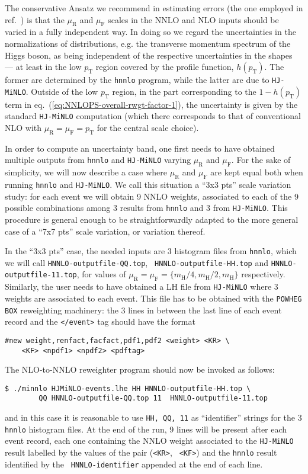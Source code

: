 \documentclass[11pt,a4paper]{article}
\newcommand{\noun}[1]{{\tt #1}}
\newcommand{\POWHEGBOX}{\noun{POWHEG BOX}}
\newcommand{\HJMINLO}{\noun{HJ-MiNLO}}
\newcommand{\HNNLO}{\noun{hnnlo}}
\newcommand{\mur}{\mu_{\scriptscriptstyle \mathrm{R}}}
\newcommand{\muf}{\mu_{\scriptscriptstyle \mathrm{F}}}
\newcommand{\pt}{p_{\scriptscriptstyle \mathrm{T}}}
\newcommand{\mh}{m_{\scriptscriptstyle \mathrm{H}}}
\begin{document}
The conservative Ansatz we recommend in estimating errors (the one
employed in ref.~\cite{Hamilton:2013fea}) is that the $\mur$ and
$\muf$ scales in the NNLO and NLO inputs should be varied in a fully
independent way. In doing so we regard the uncertainties in the
normalizations of distributions, e.g. the transverse momentum spectrum
of the Higgs boson, as being independent of the respective
uncertainties in the shapes --- at least in the low $\pt$ region
covered by the profile function, $h(\pt)$.  The former are determined
by the \HNNLO{} program, while the latter are due to
\HJMINLO{}. Outside of the low $\pt$ region, in the part corresponding
to the $1-h(\pt)$ term in eq.~(\ref{eq:NNLOPS-overall-rwgt-factor-1}),
the uncertainty is given by the standard \HJMINLO{} computation (which
there corresponds to that of conventional NLO with $\mur=\muf=\pt$ for
the central scale choice).

In order to compute an uncertainty band, one first needs to have
obtained multiple outputs from \HNNLO{} and \HJMINLO{} varying $\mur$
and $\muf$. For the sake of simplicity, we will now describe a case
where $\mur$ and $\muf$ are kept equal both when running \HNNLO{} and
\HJMINLO{}. We call this situation a ``3x3 pts'' scale variation
study: for each event we will obtain 9 NNLO weights, associated to
each of the 9 possible combinations among 3 results from \HNNLO{} and
3 from \HJMINLO{}.  This procedure is general enough to be
straightforwardly adapted to the more general case of a ``7x7 pts''
scale variation, or variation thereof.

In the ``3x3 pts'' case, the needed inputs are 3 histogram files from
\HNNLO{}, which we will call {\tt HNNLO-outputfile-QQ.top}, {\tt
  HNNLO-outputfile-HH.top} and {\tt HNNLO-outputfile-11.top}, for
values of $\mur=\muf=\{\mh/4,\mh/2,\mh\}$ respectively.  Similarly,
the user needs to have obtained a LH file from \HJMINLO{} where 3
weights are associated to each event. This file has to be obtained
with the \POWHEGBOX{} reweighting machinery: the 3 lines in between
the last line of each event record and the {\tt </event>} tag should
have the format
\begin{verbatim}
#new weight,renfact,facfact,pdf1,pdf2 <weight> <KR> \ 
    <KF> <npdf1> <npdf2> <pdftag>
\end{verbatim}
%
The NLO-to-NNLO reweighter program should now be invoked as follows:
\begin{verbatim}
$ ./minnlo HJMiNLO-events.lhe HH HNNLO-outputfile-HH.top \
        QQ HNNLO-outputfile-QQ.top 11  HNNLO-outputfile-11.top
\end{verbatim}
and in this case it is reasonable to use {\tt HH, QQ, 11} as
``identifier'' strings for the 3 \HNNLO{} histogram files.  At the end
of the run, 9 lines will be present after each event record, each one
containing the NNLO weight associated to the \HJMINLO{} result
labelled by the values of the pair ({\tt <KR>}, {\tt
  <KF>}) and the \HNNLO{} result identified by the {\tt
  HNNLO-identifier} appended at the end of each line.
\end{document}
